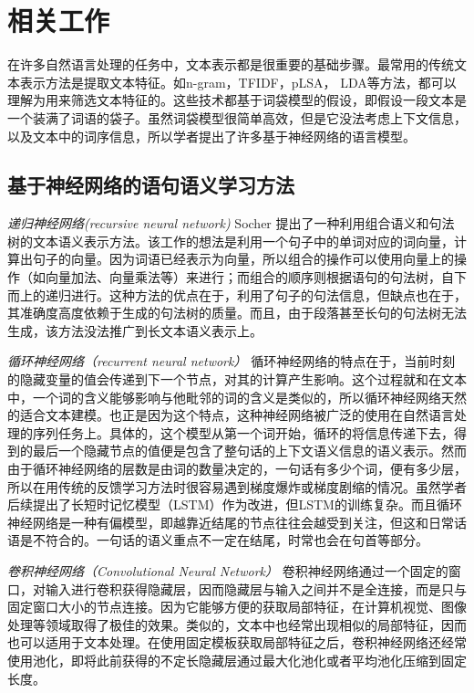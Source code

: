 \documentclass[UTF8,11pt,a4paper,nofonts]{ctexart}
\begin{document}

\section{相关工作}

在许多自然语言处理的任务中，文本表示都是很重要的基础步骤。最常用的传统文本表示方法是提取文本特征。如n-gram\cite{Lin2003Automatic}，TFIDF\cite{Soucy2005Beyond}，pLSA\cite{Hofmann2001Unsupervised}，
LDA\cite{Blei2003Latent}等方法，都可以理解为用来筛选文本特征的。这些技术都基于词袋模型的假设，即假设一段文本是一个装满了词语的袋子。虽然词袋模型很简单高效，但是它没法考虑上下文信息，以及文本中的词序信息，所以学者提出了许多基于神经网络的语言模型。

\subsection{基于神经网络的语句语义学习方法}

\textit{递归神经网络(recursive neural network)} Socher \cite{socher2013recursive} 提出了一种利用组合语义和句法树的文本语义表示方法。该工作的想法是利用一个句子中的单词对应的词向量，计算出句子的向量。因为词语已经表示为向量，所以组合的操作可以使用向量上的操作（如向量加法、向量乘法等）来进行；而组合的顺序则根据语句的句法树，自下而上的递归进行。这种方法的优点在于，利用了句子的句法信息，但缺点也在于，其准确度高度依赖于生成的句法树的质量。而且，由于段落甚至长句的句法树无法生成，该方法没法推广到长文本语义表示上。

\textsl{循环神经网络（recurrent neural network）} 
循环神经网络\cite{elman1990finding}的特点在于，当前时刻的隐藏变量的值会传递到下一个节点，对其的计算产生影响。这个过程就和在文本中，一个词的含义能够影响与他毗邻的词的含义是类似的，所以循环神经网络天然的适合文本建模。也正是因为这个特点，这种神经网络被广泛的使用在自然语言处理的序列任务上。具体的，这个模型从第一个词开始，循环的将信息传递下去，得到的最后一个隐藏节点的值便是包含了整句话的上下文语义信息的语义表示。然而由于循环神经网络的层数是由词的数量决定的，一句话有多少个词，便有多少层，所以在用传统的反馈学习方法时很容易遇到梯度爆炸或梯度剧缩的情况。虽然学者后续提出了长短时记忆模型（LSTM）作为改进，但LSTM的训练复杂。而且循环神经网络是一种有偏模型，即越靠近结尾的节点往往会越受到关注，但这和日常话语是不符合的。一句话的语义重点不一定在结尾，时常也会在句首等部分。

{\itshape 卷积神经网络（Convolutional Neural Network）}
卷积神经网络\cite{lecun1998gradient}通过一个固定的窗口，对输入进行卷积获得隐藏层，因而隐藏层与输入之间并不是全连接，而是只与固定窗口大小的节点连接。因为它能够方便的获取局部特征，在计算机视觉、图像处理等领域取得了极佳的效果。类似的，文本中也经常出现相似的局部特征，因而也可以适用于文本处理。在使用固定模板获取局部特征之后，卷积神经网络还经常使用池化，即将此前获得的不定长隐藏层通过最大化池化或者平均池化压缩到固定长度。
\end{document}
